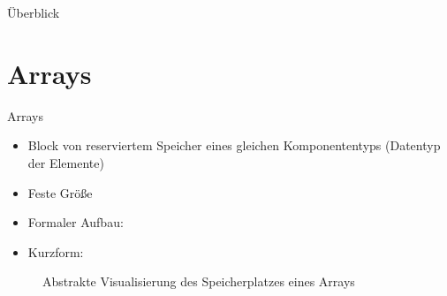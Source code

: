 \documentclass{../tuda-beamer}
\date{10. November 2021}
\begin{document}
  \maketitle

  \begin{frame}{Überblick}
    \tableofcontents
  \end{frame}


  \section{Arrays}
  \begin{frame}{Arrays}
    \begin{itemize}
      \item Block von reserviertem Speicher eines gleichen Komponententyps (Datentyp der Elemente)
      \item Feste Größe
      \item Formaler Aufbau: 
      \item Kurzform: 
    \end{itemize}
    \begin{figure}[h]
      \centering
      \begin{memory}[scale=.725]
      \end{memory}
      \caption{Abstrakte Visualisierung des Speicherplatzes eines Arrays }
    \end{figure}
  \end{frame}
\end{document}
